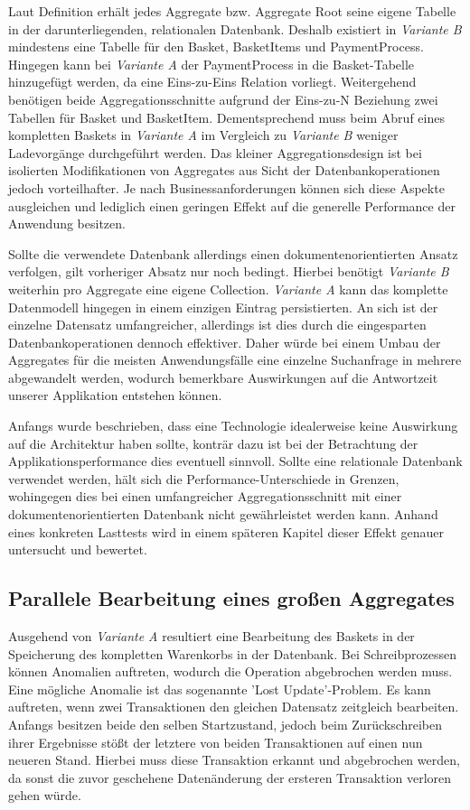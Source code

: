 Laut Definition erhält jedes Aggregate bzw. Aggregate Root seine eigene Tabelle in der darunterliegenden, relationalen Datenbank. Deshalb existiert in \emph{Variante B} mindestens eine Tabelle für den Basket, BasketItems und PaymentProcess. Hingegen kann bei \emph{Variante A} der PaymentProcess in die Basket-Tabelle hinzugefügt werden, da eine Eins-zu-Eins Relation vorliegt. Weitergehend benötigen beide Aggregationsschnitte aufgrund der Eins-zu-N Beziehung zwei Tabellen für Basket und BasketItem. Dementsprechend muss beim Abruf eines kompletten Baskets in \emph{Variante A} im Vergleich zu \emph{Variante B} weniger Ladevorgänge durchgeführt werden. Das kleiner Aggregationsdesign ist bei isolierten Modifikationen von Aggregates aus Sicht der Datenbankoperationen jedoch vorteilhafter. Je nach Businessanforderungen können sich diese Aspekte ausgleichen und lediglich einen geringen Effekt auf die generelle Performance der Anwendung besitzen.

Sollte die verwendete Datenbank allerdings einen dokumentenorientierten Ansatz verfolgen, gilt vorheriger Absatz nur noch bedingt. Hierbei benötigt \emph{Variante B} weiterhin pro Aggregate eine eigene \gls{Collection}. \emph{Variante A} kann das komplette Datenmodell hingegen in einem einzigen Eintrag persistierten. An sich ist der einzelne Datensatz umfangreicher, allerdings ist dies durch die eingesparten Datenbankoperationen dennoch effektiver. Daher würde bei einem Umbau der Aggregates für die meisten Anwendungsfälle eine einzelne Suchanfrage in mehrere abgewandelt werden, wodurch bemerkbare Auswirkungen auf die Antwortzeit unserer Applikation entstehen können. 

Anfangs wurde beschrieben, dass eine Technologie idealerweise keine Auswirkung auf die Architektur haben sollte, konträr dazu ist bei der Betrachtung der Applikationsperformance dies eventuell sinnvoll. Sollte eine relationale Datenbank verwendet werden, hält sich die Performance-Unterschiede in Grenzen, wohingegen dies bei einen umfangreicher Aggregationsschnitt mit einer dokumentenorientierten Datenbank nicht gewährleistet werden kann. Anhand eines konkreten Lasttests wird in einem späteren Kapitel dieser Effekt genauer untersucht und bewertet.

\subsection{Parallele Bearbeitung eines großen Aggregates}

Ausgehend von \emph{Variante A} resultiert eine Bearbeitung des Baskets in der Speicherung des kompletten Warenkorbs in der Datenbank. Bei Schreibprozessen können Anomalien auftreten, wodurch die Operation abgebrochen werden muss. Eine mögliche Anomalie ist das sogenannte 'Lost Update'-Problem. Es kann auftreten, wenn zwei Transaktionen den gleichen Datensatz zeitgleich bearbeiten. Anfangs besitzen beide den selben Startzustand, jedoch beim Zurückschreiben ihrer Ergebnisse stößt der letztere von beiden Transaktionen auf einen nun neueren Stand. Hierbei muss diese Transaktion erkannt und abgebrochen werden, da sonst die zuvor geschehene Datenänderung der ersteren Transaktion verloren gehen würde.

